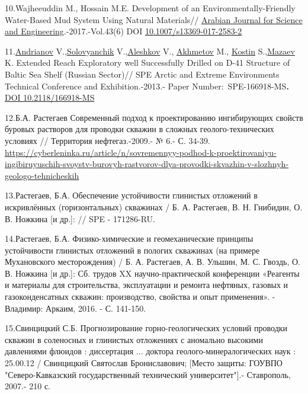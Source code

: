\begin{references}
10.Wajheeuddin M., Hossain M.E. Development of an
Environmentally-Friendly Water-Based Mud System Using Natural
Materials//
\href{https://www.researchgate.net/journal/Arabian-Journal-for-Science-and-Engineering-2191-4281?_tp=eyJjb250ZXh0Ijp7ImZpcnN0UGFnZSI6InB1YmxpY2F0aW9uIiwicGFnZSI6InB1YmxpY2F0aW9uIn19}{Arabian
Journal for Science and Engineering}.-2017.-Vol.43(6) DOI
\href{https://doi.org/10.1007/s13369-017-2583-2}{10.1007/s13369-017-2583-2}

11.\href{javascript:;}{Andrianov} V.,\href{javascript:;}{Solovyanchik}
V.,\href{javascript:;}{Aleshkov} V., \href{javascript:;}{Akhmetov} M.,
\href{javascript:;}{Kostin} S.,\href{javascript:;}{Mazaev} K. Extended
Reach Exploratory well Successfully Drilled on D-41 Structure of Baltic
Sea Shelf (Russian Sector)// SPE Arctic and Extreme Environments
Technical Conference and Exhibition.-2013.- Paper
Number:~SPE-166918-MS{\bfseries .}
\href{https://doi.org/10.2118/166918-MS}{DOI 10.2118/166918-MS}

12.Б.А. Растегаев Современный подход к проектированию ингибирующих
свойств буровых растворов для проводки скважин в сложных
геолого-технических условиях // Территория нефтегаз.-2009.- № 6.- С.
34-39.
\url{https://cyberleninka.ru/article/n/sovremennyy-podhod-k-proektirovaniyu-ingibiruyuschih-svoystv-burovyh-rastvorov-dlya-provodki-skvazhin-v-slozhnyh-geologo-tehnicheskih}

13.Растегаев, Б.А. Обеспечение устойчивости глинистых отложений в
искривлённых (горизонтальных) скважинах / Б. А. Растегаев, В. Н.
Гнибидин, О. В. Ножкина {[}и др.{]}: // SPE - 171286-RU.

14.Растегаев, Б.А. Физико-химические и геомеханические принципы
устойчивости глинистых отложений в пологих скважинах (на примере
Мухановского месторождения) / Б. А. Растегаев, А. В. Ульшин, М. С.
Гвоздь, О. В. Ножкина {[}и др.{]}: Сб. трудов XX научно-практической
конференции «Реагенты и материалы для строительства, эксплуатации и
ремонта нефтяных, газовых и газоконденсатных скважин: производство,
свойства и опыт применения». - Владимир: Аркаим, 2016. - С. 141-150.

15.Свинцицкий С.Б. Прогнозирование горно-геологических условий проводки
скважин в соленосных и глинистых отложениях с аномально высокими
давлениями флюидов : диссертация ... доктора геолого-минералогических
наук : 25.00.12 / Свинцицкий Святослав Брониславович; {[}Место защиты:
ГОУВПО "Северо-Кавказский государственный технический университет"{]}.-
Ставрополь, 2007.- 210 с.


\end{references}
